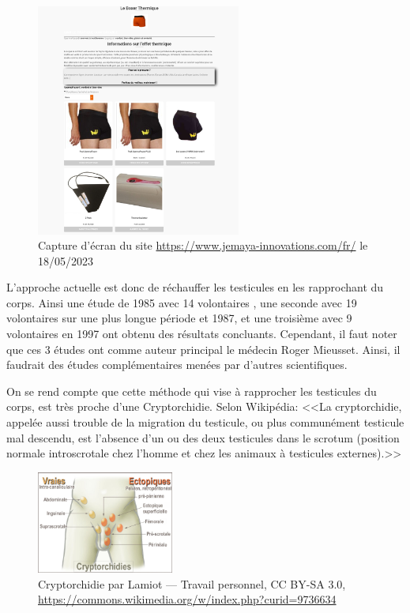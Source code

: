 \documentclass[12pt,a4paper]{report}
\begin{document}
\begin{figure}[h]
    \centering
    \includegraphics[width=0.6\textwidth]{images/scientiphique/www.jemaya-innovations.com.jpeg}
    \caption{Capture d'écran du site \href{https://www.jemaya-innovations.com/fr/}{https://www.jemaya-innovations.com/fr/} le 18/05/2023}
    \label{fig:site-jemaya}
\end{figure}

L'approche actuelle est donc de réchauffer les testicules en les rapprochant du corps.
Ainsi une étude de 1985 avec 14 volontaires \cite{mieussetInhibitingEffectArtificial1985}, une seconde avec 19 volontaires sur une plus longue période et 1987\cite{mieussetHyperthermiaHumanSpermatogenesis1987}, et une troisième avec 9 volontaires en 1997\cite{mieussetPotentialMildTesticular1994} ont obtenu des résultats concluants.
Cependant, il faut noter que ces 3 études ont comme auteur principal le médecin Roger Mieusset. Ainsi, il faudrait des études complémentaires menées par d'autres scientifiques.

On se rend compte que cette méthode qui vise à rapprocher les testicules du corps, est très proche d'une Cryptorchidie.
Selon Wikipédia: <<La cryptorchidie, appelée aussi trouble de la migration du testicule, ou plus communément testicule mal descendu, est l'absence d'un ou des deux testicules dans le scrotum (position normale introscrotale chez l'homme et chez les animaux à testicules externes).>>\cite{Cryptorchidie2023a}

\begin{figure}[H]
    \centering
    \includegraphics[width=0.4\textwidth]{images/scientiphique/CryptorchidismForms.jpg}
    \caption{Cryptorchidie par Lamiot — Travail personnel, CC BY-SA 3.0, \href{https://commons.wikimedia.org/w/index.php?curid=9736634}{https://commons.wikimedia.org/w/index.php?curid=9736634}}
    \label{fig:cryptorchidie}
\end{figure}
\end{document}
